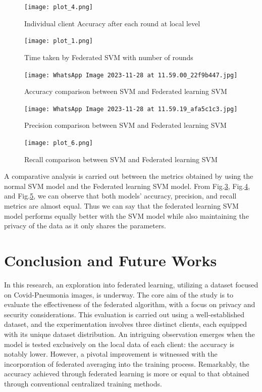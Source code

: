 \documentclass[conference]{IEEEtran}
\begin{document}
\begin{figure}[!htbp]
    \centering
    \texttt{[image: plot\_4.png]}
    \caption{Individual client Accuracy after each round at local level}
    \label{di6}
\end{figure}

\begin{figure}[!htbp]
    \centering
    \texttt{[image: plot\_1.png]}
    \caption{Time taken by Federated SVM with number of rounds}
    \label{di7}
\end{figure}



\begin{figure}[H]
    \centering
    \texttt{[image: WhatsApp Image 2023-11-28 at 11.59.00\_22f9b447.jpg]}
    \caption{Accuracy comparison between SVM and Federated learning SVM}
    \label{di8}
\end{figure}
\begin{figure}[H]
    \centering
    \texttt{[image: WhatsApp Image 2023-11-28 at 11.59.19\_afa5c1c3.jpg]}
    \caption{Precision comparison between SVM and Federated learning SVM}
    \label{di9}
\end{figure}
\begin{figure}[H]
    \centering
    \texttt{[image: plot\_6.png]}
    \caption{Recall comparison between SVM and Federated learning SVM}
    \label{di10}
\end{figure}

A comparative analysis is carried out between the metrics obtained by using the normal SVM model and the Federated learning SVM model. From Fig.\ref{di8}, Fig.\ref{di9}, and Fig.\ref{di10}, we can observe that both models' accuracy, precision, and recall metrics are almost equal. Thus we can say that the federated learning SVM model performs equally better with the SVM model while also maintaining the privacy of the data as it only shares the parameters.

\section{Conclusion and Future Works}
In this research, an exploration into federated learning, utilizing a dataset focused on Covid-Pneumonia images, is underway. The core aim of the study is to evaluate the effectiveness of the federated algorithm, with a focus on privacy and security considerations. This evaluation is carried out using a well-established dataset, and the experimentation involves three distinct clients, each equipped with its unique dataset distribution. An intriguing observation emerges when the model is tested exclusively on the local data of each client: the accuracy is notably lower. However, a pivotal improvement is witnessed with the incorporation of federated averaging into the training process. Remarkably, the accuracy achieved through federated learning is more or equal to that obtained through conventional centralized training methods.
\end{document}
